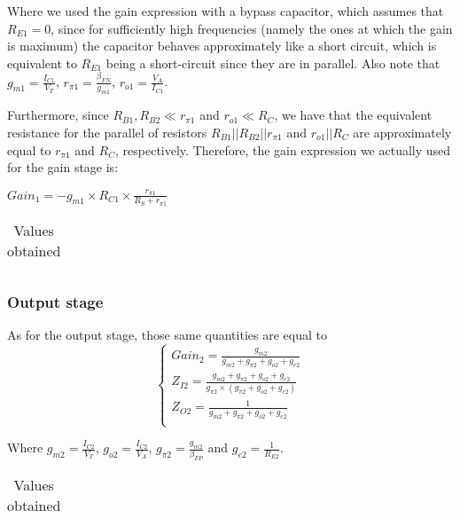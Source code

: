 Where we used the gain expression with a bypass capacitor, which assumes that $R_{E1} = 0$, since for sufficiently high frequencies (namely the ones at which the gain is maximum) the capacitor behaves approximately like a short circuit, which is equivalent to $R_{E1}$ being a short-circuit since they are in parallel. Also note that $g_{m1}=\frac{I_{C1}}{V_T}$, $r_{\pi 1}=\frac{\beta_{FN}}{g_{m1}}$, $r_{o1}=\frac{V_A}{I_{C1}}$.

Furthermore, since $R_{B1}, R_{B2} \ll r_{\pi1}$ and $r_{o1} \ll R_C$, we have that the equivalent resistance for the parallel of resistors $R_{B1} || R_{B2} || r_{\pi1}$ and $r_{o1} || R_C$ are approximately equal to $r_{\pi1}$ and $R_C$, respectively. Therefore, the gain expression we actually used for the gain stage is:


$Gain_1 = -g_{m1} \times R_{C1} \times \frac{r_{\pi1}}{R_S+r_{\pi1}}$


\begin{table}[H]
  \centering
  \begin{tabular}{|c|c|}
    \hline
      
  \end{tabular}
  \caption{Values obtained}
  \label{tab:resultsAC1}
\end{table}


\subsubsection{Output stage}
As for the output stage, those same quantities are equal to
\begin{equation}
\begin{cases}
Gain_2 = \frac{g_{m2}}{g_{m2}+g_{\pi 2}+g_{o2}+g_{e2}} \\ %
Z_{I2}= \frac{g_{m2}+g_{\pi 2}+g_{o2}+g_{e2}}{g_{\pi 2} \times (g_{\pi 2}+g_{o2}+g_{e2})} \\ %
Z_{O2} = \frac{1}{g_{m2}+g_{\pi 2}+g_{o2}+g_{e2}} \\ %
\end{cases}
\end{equation}

Where $g_{m2} = \frac{I_{C2}}{V_T}$, $g_{o2} = \frac{I_{C2}}{V_A}$, $g_{\pi 2} = \frac{g_{m2}}{\beta_{FP}}$ and $g_{e2} = \frac{1}{R_{E2}}$.

\begin{table}[H]
  \centering
  \begin{tabular}{|c|c|}
    \hline
      
  \end{tabular}
  \caption{Values obtained}
  \label{tab:resultsAC2}
\end{table}

